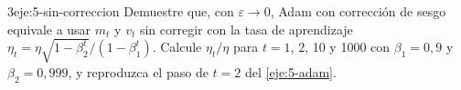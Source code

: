 \begin{ejercicio}{3}{eje:5-sin-correccion}
Demuestre que, con $\varepsilon\to 0$, Adam con corrección de sesgo equivale a usar $m_t$ y $v_t$ sin corregir con la tasa de aprendizaje $\eta_t=\eta\sqrt{1-\beta_2^{t}}/(1-\beta_1^{t})$. Calcule $\eta_t/\eta$ para $t=1$, 2, 10 y 1000 con $\beta_1=0{,}9$ y $\beta_2=0{,}999$, y reproduzca el paso de $t=2$ del \cref{eje:5-adam}.
\end{ejercicio}
